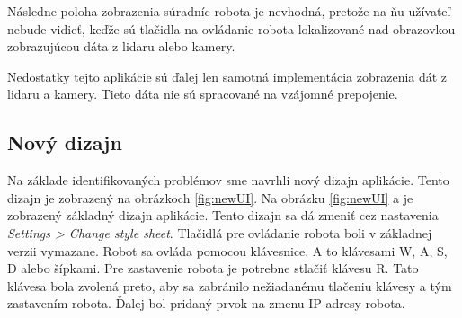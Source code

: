 Následne poloha zobrazenia súradníc robota je nevhodná, pretože na ňu užívateľ nebude vidieť, keďže sú tlačidla na
ovládanie robota lokalizované nad obrazovkou zobrazujúcou dáta z lidaru alebo kamery.

Nedostatky tejto aplikácie sú ďalej len samotná implementácia zobrazenia dát z lidaru a kamery. Tieto dáta nie sú
spracované na vzájomné prepojenie.

\subsection{Nový dizajn}

Na základe identifikovaných problémov sme navrhli nový dizajn aplikácie. Tento dizajn je zobrazený na obrázkoch
\ref{fig:newUI}. Na obrázku \ref{fig:newUI} a je zobrazený základný dizajn aplikácie. Tento dizajn sa dá zmeniť cez
nastavenia \textit{Settings > Change style sheet}. Tlačidlá pre ovládanie robota boli v základnej verzii vymazane.
Robot sa ovláda pomocou klávesnice. A to klávesami W, A, S, D alebo šípkami. Pre zastavenie robota je potrebne stlačiť
klávesu R. Tato klávesa bola zvolená preto, aby sa zabránilo nežiadanému tlačeniu klávesy a tým zastavením robota.
Ďalej bol pridaný prvok na zmenu IP adresy robota.

